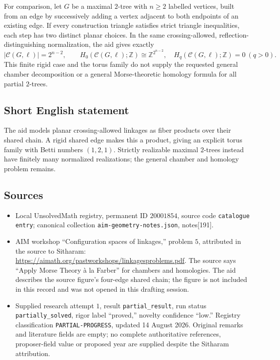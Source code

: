 \documentclass[11pt]{article}
\newcommand{\Z}{\mathbb{Z}}
\begin{document}
For comparison, let \(G\) be a maximal \(2\)-tree with \(n\geq2\) labelled vertices, built from an edge by successively adding a vertex adjacent to both endpoints of an existing edge. If every construction triangle satisfies strict triangle inequalities, each step has two distinct planar choices. In the same crossing-allowed, reflection-distinguishing normalization, the aid gives exactly
\[
 |\mathcal C(G,\ell)|=2^{n-2},\qquad
 H_0(\mathcal C(G,\ell);\Z)\cong\Z^{2^{n-2}},\quad
 H_q(\mathcal C(G,\ell);\Z)=0\ (q>0).
\]
This finite rigid case and the torus family do not supply the requested general chamber decomposition or a general Morse-theoretic homology formula for all partial \(2\)-trees.
\subsection{Short English statement}
The aid models planar crossing-allowed linkages as fiber products over their shared chain. A rigid shared edge makes this a product, giving an explicit torus family with Betti numbers \((1,2,1)\). Strictly realizable maximal \(2\)-trees instead have finitely many normalized realizations; the general chamber and homology problem remains.
\subsection{Sources}
\begin{itemize}
\item Local UnsolvedMath registry, permanent ID \(20001854\), source code \texttt{catalogue entry}; canonical collection \texttt{aim-geometry-notes.json}, notes[191].
\item AIM workshop ``Configuration spaces of linkages,'' problem \(5\), attributed in the source to Sitharam: \url{https://aimath.org/pastworkshops/linkagesproblems.pdf}. The source says ``Apply Morse Theory \`a la Farber'' for chambers and homologies. The aid describes the source figure's four-edge shared chain; the figure is not included in this record and was not opened in this drafting session.
\item Supplied research attempt \(1\), result \texttt{partial\_result}, run status \texttt{partially\_solved}, rigor label ``proved,'' novelty confidence ``low.'' Registry classification \texttt{PARTIAL-PROGRESS}, updated 14 August 2026. Original remarks and literature fields are empty; no complete authoritative references, proposer-field value or proposed year are supplied despite the Sitharam attribution.
\end{itemize}
\end{document}
